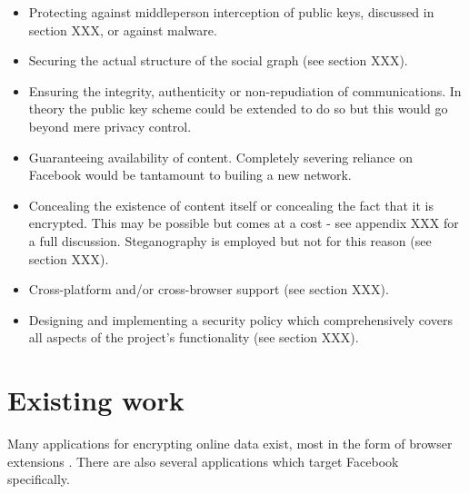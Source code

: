 \begin{itemize}
    \item Protecting against middleperson interception of public keys, discussed in section XXX, or against malware.

    \item Securing the actual structure of the social graph (see section XXX).
    
    \item Ensuring the integrity, authenticity or non-repudiation of communications. In theory the public key scheme could be extended to do so but this would go beyond mere privacy control.
    
    \item Guaranteeing availability of content. Completely severing reliance on Facebook would be tantamount to builing a new network.
    
    \item Concealing the existence of content itself or concealing the fact that it is encrypted. This may be possible but comes at a cost - see appendix XXX for a full discussion. Steganography is employed but not for this reason (see section XXX).
    
    \item Cross-platform and/or cross-browser support (see section XXX).
    
    \item Designing and implementing a security policy which comprehensively covers all aspects of the project's functionality (see section XXX).
    
\end{itemize}


\section{Existing work}
\label{sec:existing}

    Many applications for encrypting online data exist, most in the form of browser extensions \cite{firegpg} \cite{cryptfire} \cite{textcrypt}. There are also several applications which target Facebook specifically.
    
